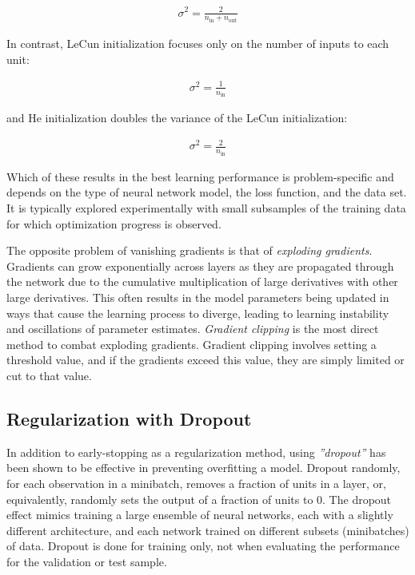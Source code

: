 \begin{itemize}
\begin{align*}
  \sigma^2 = \frac{2}{n_{\text{in}} + n_{\text{out}}}
\end{align*}

\noindent In contrast, LeCun initialization focuses only on the number of inputs to each unit:

\begin{align*}
  \sigma^2 = \frac{1}{n_{\text{in}}}
\end{align*}

\noindent and He initialization doubles the variance of the LeCun initialization:

\begin{align*}
  \sigma^2 = \frac{2}{n_{\text{in}}}
\end{align*}

\end{itemize}

Which of these results in the best learning performance is problem-specific and depends on the type of neural network model, the loss function, and the data set. It is typically explored experimentally with small subsamples of the training data for which optimization progress is observed.

The opposite problem of vanishing gradients is that of \emph{exploding gradients}. Gradients can grow exponentially across layers as they are propagated through the network due to the cumulative multiplication of large derivatives with other large derivatives. This often results in the model parameters being updated in ways that cause the learning process to diverge, leading to learning instability and oscillations of parameter estimates. \emph{Gradient clipping} is the most direct method to combat exploding gradients. Gradient clipping involves setting a threshold value, and if the gradients exceed this value, they are simply limited or cut to that value.


\subsection{Regularization with Dropout}

In addition to early-stopping as a regularization method, using \emph{''dropout''} has been shown to be effective in preventing overfitting a model. Dropout randomly, for each observation in a minibatch, removes a fraction of units in a layer, or, equivalently, randomly sets the output of a fraction of units to 0. The dropout effect mimics training a large ensemble of neural networks, each with a slightly different architecture, and each network trained on different subsets (minibatches) of data. Dropout is done for training only, not when evaluating the performance for the validation or test sample.

